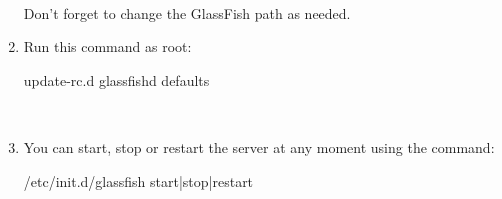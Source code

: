 \documentclass[a4paper]{article}
\begin{document}
\begin{appendices}
\begin{enumerate}
					\begin{figure}[ht]
						\centering	
						\theverbbox
					\end{figure}\\
					Don't forget to change the GlassFish path as needed.
					\item Run this command as root:
					\begin{verbbox}
						update-rc.d glassfishd defaults
					\end{verbbox}
					\begin{figure}[ht]
						\centering	
						\theverbbox
					\end{figure}\\
					\item You can start, stop or restart the server at any moment using the command:
					\begin{verbbox}
						/etc/init.d/glassfish start|stop|restart
					\end{verbbox}
					\begin{figure}[ht]
						\centering	
						\theverbbox
					\end{figure}
					
				\end{enumerate}
			\newpage

\end{appendices}
\end{document}
